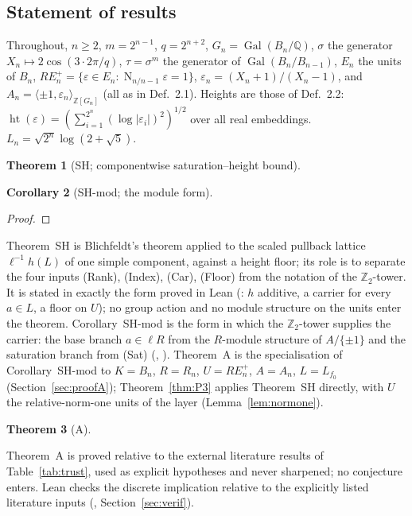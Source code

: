 \documentclass[11pt]{amsart}
\newtheorem{theorem}{Theorem}[section]
\newtheorem{corollary}[theorem]{Corollary}
\theoremstyle{remark}\newtheorem{remark}[theorem]{Remark}
\theoremstyle{definition}\newtheorem{definition}[theorem]{Definition}
\theoremstyle{definition}\newtheorem{algorithm}[theorem]{Algorithm}
\newcommand{\Q}{\mathbb{Q}}\newcommand{\Z}{\mathbb{Z}}\newcommand{\R}{\mathbb{R}}\newcommand{\F}{\mathbb{F}}
\newcommand{\RE}{RE^{+}_n}\newcommand{\ord}{\operatorname{ord}}\newcommand{\hgt}{\operatorname{ht}}
\newcommand{\Nr}{\operatorname{N}_{n/n-1}}\newcommand{\covol}{\operatorname{covol}}
\providecommand{\proofsdir}{../../proofs} %
\begin{document}
\subsection{Statement of results}\label{sec:results}
Throughout, $n\ge2$, $m=2^{n-1}$, $q=2^{n+2}$, $G_n=\operatorname{Gal}(B_n/\Q)$, $\sigma$ the generator $X_n\mapsto2\cos(3\cdot2\pi/q)$, $\tau=\sigma^{m}$ the generator of $\operatorname{Gal}(B_n/B_{n-1})$, $E_n$ the units of $B_n$, $\RE=\{\varepsilon\in E_n:\Nr\varepsilon=1\}$, $\varepsilon_n=(X_n+1)/(X_n-1)$, and $A_n=\langle\pm1,\varepsilon_n\rangle_{\Z[G_n]}$ (all as in \cite{KY} Def.~2.1). Heights are those of \cite{MO16} Def.~2.2: $\hgt(\varepsilon)=(\sum_{i=1}^{2^n}(\log|\varepsilon_i|)^2)^{1/2}$ over all real embeddings. $L_n=\sqrt{2^n}\log(2+\sqrt5)$.

\begin{theorem}[SH; componentwise saturation--height bound]\label{thm:SH}

\end{theorem}
\begin{corollary}[SH-mod; the module form]\label{cor:SHmod}

\end{corollary}
\begin{proof}

\end{proof}
Theorem~SH is Blichfeldt's theorem applied to the scaled pullback lattice $\ell^{-1}h(L)$ of one simple component, against a height floor; its role is to separate the four inputs (Rank), (Index), (Car), (Floor) from the notation of the $\Z_2$-tower. It is stated in exactly the form proved in Lean (: $h$ additive, a carrier for every $a\in L$, a floor on $U$); no group action and no module structure on the units enter the theorem. Corollary~SH-mod is the form in which the $\Z_2$-tower supplies the carrier: the base branch $a\in\ell R$ from the $R$-module structure of $A/\{\pm1\}$ and the saturation branch from (Sat) (, ). Theorem~A is the specialisation of Corollary~SH-mod to $K=B_n$, $R=R_n$, $U=\RE$, $A=A_n$, $L=L_{f_0}$ (Section~\ref{sec:proofA}); Theorem~\ref{thm:P3} applies Theorem~SH directly, with $U$ the relative-norm-one units of the layer (Lemma~\ref{lem:normone}).
\begin{theorem}[A]\label{thm:A}

\end{theorem}
Theorem~A is proved relative to the external literature results of Table~\ref{tab:trust}, used as explicit hypotheses and never sharpened; no conjecture enters. Lean checks the discrete implication relative to the explicitly listed literature inputs (, Section~\ref{sec:verif}).
\end{document}
